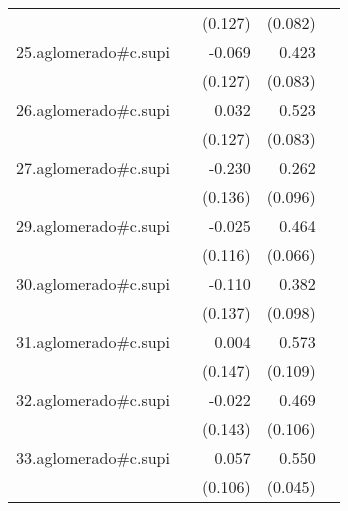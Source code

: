 {\begin{longtable}{l*{4}{D{.}{.}{-1}}}
            &                     &     (0.127)         &     (0.082)         &                     \\
\addlinespace
25.aglomerado#c.supi&                     &      -0.069         &       0.423\sym{***}&                     \\
            &                     &     (0.127)         &     (0.083)         &                     \\
\addlinespace
26.aglomerado#c.supi&                     &       0.032         &       0.523\sym{***}&                     \\
            &                     &     (0.127)         &     (0.083)         &                     \\
\addlinespace
27.aglomerado#c.supi&                     &      -0.230         &       0.262\sym{**} &                     \\
            &                     &     (0.136)         &     (0.096)         &                     \\
\addlinespace
29.aglomerado#c.supi&                     &      -0.025         &       0.464\sym{***}&                     \\
            &                     &     (0.116)         &     (0.066)         &                     \\
\addlinespace
30.aglomerado#c.supi&                     &      -0.110         &       0.382\sym{***}&                     \\
            &                     &     (0.137)         &     (0.098)         &                     \\
\addlinespace
31.aglomerado#c.supi&                     &       0.004         &       0.573\sym{***}&                     \\
            &                     &     (0.147)         &     (0.109)         &                     \\
\addlinespace
32.aglomerado#c.supi&                     &      -0.022         &       0.469\sym{***}&                     \\
            &                     &     (0.143)         &     (0.106)         &                     \\
\addlinespace
33.aglomerado#c.supi&                     &       0.057         &       0.550\sym{***}&                     \\
            &                     &     (0.106)         &     (0.045)         &                     \\

\end{longtable}}
